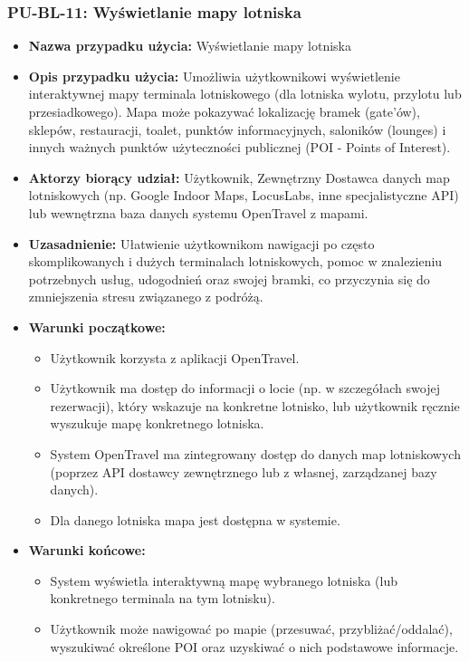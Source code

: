 \documentclass[a4paper,12pt]{article}
\begin{document}
\subsubsection{PU-BL-11: Wyświetlanie mapy lotniska}
\begin{itemize}
    \item \textbf{Nazwa przypadku użycia:} Wyświetlanie mapy lotniska
    \item \textbf{Opis przypadku użycia:} Umożliwia użytkownikowi wyświetlenie interaktywnej mapy terminala lotniskowego (dla lotniska wylotu, przylotu lub przesiadkowego). Mapa może pokazywać lokalizację bramek (gate'ów), sklepów, restauracji, toalet, punktów informacyjnych, saloników (lounges) i innych ważnych punktów użyteczności publicznej (POI - Points of Interest).
    \item \textbf{Aktorzy biorący udział:} Użytkownik, Zewnętrzny Dostawca danych map lotniskowych (np. Google Indoor Maps, LocusLabs, inne specjalistyczne API) lub wewnętrzna baza danych systemu OpenTravel z mapami.
    \item \textbf{Uzasadnienie:} Ułatwienie użytkownikom nawigacji po często skomplikowanych i dużych terminalach lotniskowych, pomoc w znalezieniu potrzebnych usług, udogodnień oraz swojej bramki, co przyczynia się do zmniejszenia stresu związanego z podróżą.
    \item \textbf{Warunki początkowe:}
        \begin{itemize}
            \item Użytkownik korzysta z aplikacji OpenTravel.
            \item Użytkownik ma dostęp do informacji o locie (np. w szczegółach swojej rezerwacji), który wskazuje na konkretne lotnisko, lub użytkownik ręcznie wyszukuje mapę konkretnego lotniska.
            \item System OpenTravel ma zintegrowany dostęp do danych map lotniskowych (poprzez API dostawcy zewnętrznego lub z własnej, zarządzanej bazy danych).
            \item Dla danego lotniska mapa jest dostępna w systemie.
        \end{itemize}
    \item \textbf{Warunki końcowe:}
        \begin{itemize}
            \item System wyświetla interaktywną mapę wybranego lotniska (lub konkretnego terminala na tym lotnisku).
            \item Użytkownik może nawigować po mapie (przesuwać, przybliżać/oddalać), wyszukiwać określone POI oraz uzyskiwać o nich podstawowe informacje.

\end{itemize}
\end{itemize}
\end{document}
